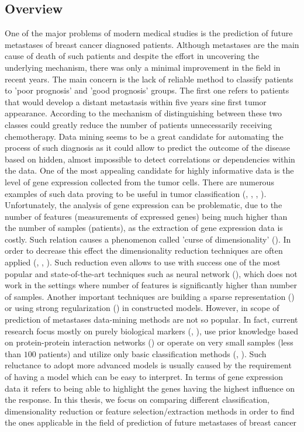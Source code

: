 \documentclass[12pt, wide]{mwart}
\begin{document}
\subsection{Overview}
One of the major problems of modern medical studies is the prediction of future metastases of breast cancer diagnosed patients. Although metastases are the main cause of death of such patients and despite the effort in uncovering the underlying mechanism, there was only a minimal improvement in the field in recent years. The main concern is the lack of reliable method to classify patients to 'poor prognosis' and 'good prognosis' groups. The first one refers to patients that would develop a distant metastasis within five years sine first tumor appearance. According to \cite{Metastasis1} the mechanism of distinguishing between these two classes could greatly reduce the number of patients unnecessarily receiving chemotherapy. Data mining seems to be a great candidate for automating the process of such diagnosis as it could allow to predict the outcome of the disease based on hidden, almost impossible to detect correlations or dependencies within the data. One of the most appealing candidate for highly informative data is the level of gene expression collected from the tumor cells. There are numerous examples of such data proving to be useful in tumor classification (\cite{BreastCancerClassification}, \cite{TumorMolecularClass}, \cite{TumorsClass1}, \cite{TumorClass2}). Unfortunately, the analysis of gene expression can be problematic, due to the number of features (measurements of expressed genes) being much higher than the number of samples (patients), as the extraction of gene expression data is costly. Such relation causes a phenomenon called 'curse of dimensionality' (\cite[p. 22-26]{ESL2}). In order to decrease this effect the dimensionality reduction techniques are often applied (\cite{MasterArts}, \cite{TumorClass4}, \cite{TumorPLS}). Such reduction even allows to use with success one of the most popular and state-of-the-art techniques such as neural network (\cite{fDNN}), which does not work in the settings where number of features is significantly higher than number of samples. Another important techniques are building a sparse representation (\cite{TumorClass3}) or using strong regularization (\cite[p. 649-666]{ESL2}) in constructed models. However, in scope of prediction of metastases data-mining methods are not so popular. In fact, current research focus mostly on purely biological markers (\cite{Metastasis4}, \cite{dataOrigin}), use prior knowledge based on protein-protein interaction networks (\cite{MetastasisScores}) or operate on very small samples (less than $100$ patients) and utilize only basic classification methods (\cite{Metastasis1}, \cite{Metastasis2}). Such reluctance to adopt more advanced models is usually caused by the requirement of having a model which can be easy to interpret. In terms of gene expression data it refers to being able to highlight the genes having the highest influence on the response. In this thesis, we focus on comparing different classification, dimensionality reduction or feature selection/extraction methods in order to find the ones applicable in the field of prediction of future metastases of breast cancer 
\end{document}
